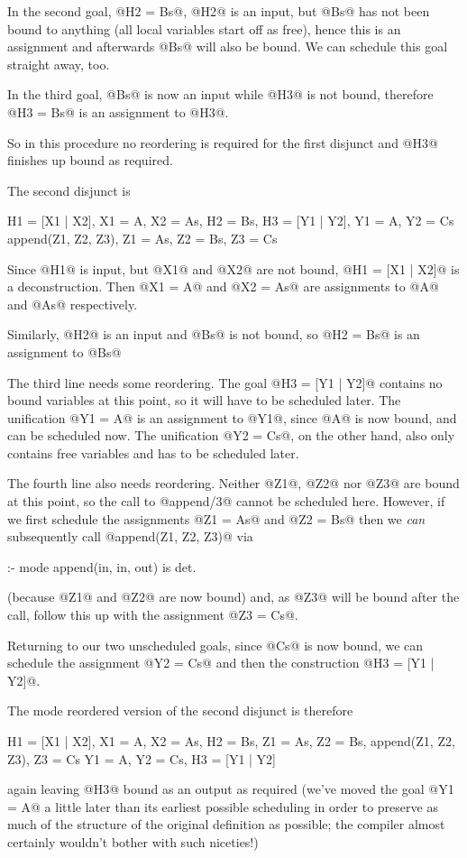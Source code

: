 In the second goal, @H2 = Bs@, @H2@ is an input, but @Bs@ has not been
bound to anything (all local variables start off as free), hence this is
an assignment and afterwards @Bs@ will also be bound.  We can schedule
this goal straight away, too.

In the third goal, @Bs@ is now an input while @H3@ is not bound,
therefore @H3 = Bs@ is an assignment to @H3@.

So in this procedure no reordering is required for the first disjunct
and @H3@ finishes up bound as required.

The second disjunct is
\begin{myverbatim}
    H1 = [X1 | X2],  X1 = A,  X2 = As,
    H2 = Bs,
    H3 = [Y1 | Y2],  Y1 = A,  Y2 = Cs
    append(Z1, Z2, Z3),  Z1 = As,  Z2 = Bs,  Z3 = Cs
\end{myverbatim}
Since @H1@ is input, but @X1@ and @X2@ are not bound, @H1 = [X1 | X2]@
is a deconstruction.  Then @X1 = A@ and @X2 = As@ are assignments to @A@
and @As@ respectively.

Similarly, @H2@ is an input and @Bs@ is not bound, so @H2 = Bs@ is an
assignment to @Bs@

The third line needs some reordering.  The goal @H3 = [Y1 | Y2]@
contains no bound variables at this point, so it will have to be
scheduled later.  The unification @Y1 = A@ is an assignment to @Y1@,
since @A@ is now bound, and can be scheduled now.  The unification
@Y2 = Cs@, on the other hand, also only contains free variables and has
to be scheduled later.

The fourth line also needs reordering.  Neither @Z1@, @Z2@ nor @Z3@ are
bound at this point, so the call to @append/3@ cannot be scheduled here.
However, if we first schedule the assignments @Z1 = As@ and
@Z2 = Bs@ then we \emph{can} subsequently call @append(Z1, Z2, Z3)@
via
\begin{myverbatim}
:- mode append(in, in, out) is det.
\end{myverbatim}
(because @Z1@ and @Z2@ are now bound) and, as @Z3@ will be bound after
the call, follow this up with the assignment @Z3 = Cs@.

Returning to our two unscheduled goals, since @Cs@ is
now bound, we can schedule the assignment @Y2 = Cs@ and then the
construction @H3 = [Y1 | Y2]@.

The mode reordered version of the second disjunct is therefore
\begin{myverbatim}
    H1 = [X1 | X2],  X1 = A,  X2 = As,
    H2 = Bs,
    Z1 = As,  Z2 = Bs,  append(Z1, Z2, Z3),  Z3 = Cs
    Y1 = A,   Y2 = Cs,  H3 = [Y1 | Y2]
\end{myverbatim}
again leaving @H3@ bound as an output as required (we've moved the goal
@Y1 = A@ a little later than its earliest possible scheduling in order to
preserve as much of the structure of the original definition as
possible; the compiler almost certainly wouldn't bother with such
niceties!)


